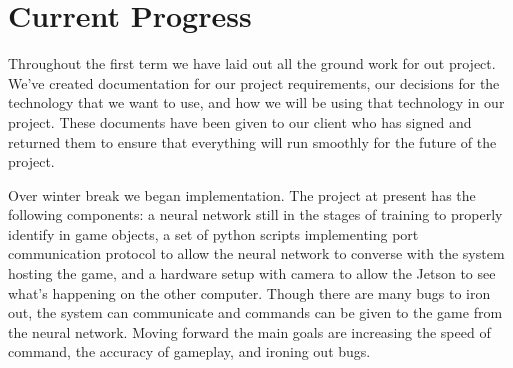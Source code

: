 \documentclass[onecolumn, draftclsnofoot,10pt, compsoc]{IEEEtran}
\begin{document}
\section{Current Progress}
Throughout the first term we have laid out all the ground work for out project.
We've created documentation for our project requirements, our decisions for the technology that we want to use, and how we will be using that technology in our project.
These documents have been given to our client who has signed and returned them to ensure that everything will run smoothly for the future of the project.

Over winter break we began implementation. 
The project at present has the following components: a neural network still in the stages of training to properly identify in game objects, a set of python scripts implementing port communication protocol to allow the neural network to converse with the system hosting the game, and a hardware setup with camera to allow the Jetson to see what's happening on the other computer.
Though there are many bugs to iron out, the system can communicate and commands can be given to the game from the neural network. 
Moving forward the main goals are increasing the speed of command, the accuracy of gameplay, and ironing out bugs.
\end{document}
